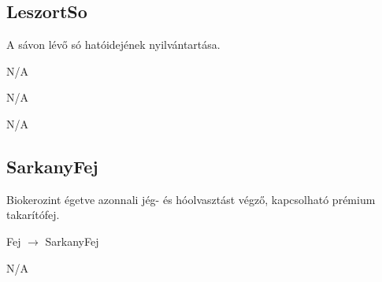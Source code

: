 \subsection{LeszortSo}
\begin{class-template-responsibility}
     A sávon lévő só hatóidejének nyilvántartása.
\end{class-template-responsibility}
\begin{class-template-baseclass}
    N/A
\end{class-template-baseclass}
\begin{class-template-interface}
    N/A
\end{class-template-interface}
\begin{class-template-attribute}
\end{class-template-attribute}
\begin{class-template-method}
    N/A
\end{class-template-method}

\subsection{SarkanyFej}
\begin{class-template-responsibility}
    Biokerozint égetve azonnali jég- és hóolvasztást végző, kapcsolható prémium takarítófej.
\end{class-template-responsibility}
\begin{class-template-baseclass}
    Fej $\rightarrow$ SarkanyFej
\end{class-template-baseclass}
\begin{class-template-interface}
    N/A
\end{class-template-interface}
\begin{class-template-attribute}
\end{class-template-attribute}
\begin{class-template-method}
\end{class-template-method}

